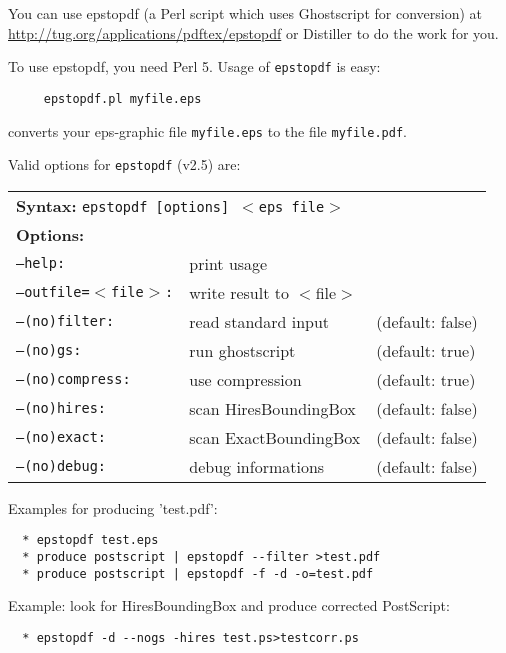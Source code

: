 \documentclass{article}
\begin{document}

  You can use epstopdf (a Perl script which uses Ghostscript for
  conversion) at \url{http://tug.org/applications/pdftex/epstopdf} or
  Distiller to do the work for you.

  To use epstopdf, you need Perl 5. Usage of \texttt{epstopdf} is easy:
\begin{verbatim}
     epstopdf.pl myfile.eps
\end{verbatim}
  converts your eps-graphic file \texttt{myfile.eps}
  to the file \texttt{myfile.pdf}.

\bigskip
\noindent Valid options for \texttt{epstopdf} (v2.5) are:
\medskip
  
\noindent\begin{tabular}{lll}
\multicolumn{3}{l}{\textbf{Syntax:} \texttt{epstopdf [options]
      $<$eps file$>$}}\\
\textbf{Options:}                               \\
\tt  --help:          & print usage           \\
\tt  --outfile=$<$file$>$:& write result to $<$file$>$\\
\tt  --(no)filter:    & read standard input   &(default: false)\\
\tt  --(no)gs:        & run ghostscript       &(default: true) \\
\tt  --(no)compress:  & use compression       &(default: true) \\
\tt  --(no)hires:     & scan HiresBoundingBox &(default: false)\\
\tt  --(no)exact:     & scan ExactBoundingBox &(default: false)\\
\tt  --(no)debug:     & debug informations    &(default: false)
\end{tabular}
\bigskip
  
\noindent Examples for producing 'test.pdf':\par
\begin{verbatim}
  * epstopdf test.eps
  * produce postscript | epstopdf --filter >test.pdf
  * produce postscript | epstopdf -f -d -o=test.pdf
\end{verbatim}
Example: look for HiresBoundingBox and produce corrected PostScript:\par
\begin{verbatim}
  * epstopdf -d --nogs -hires test.ps>testcorr.ps
\end{verbatim}
\end{document}

